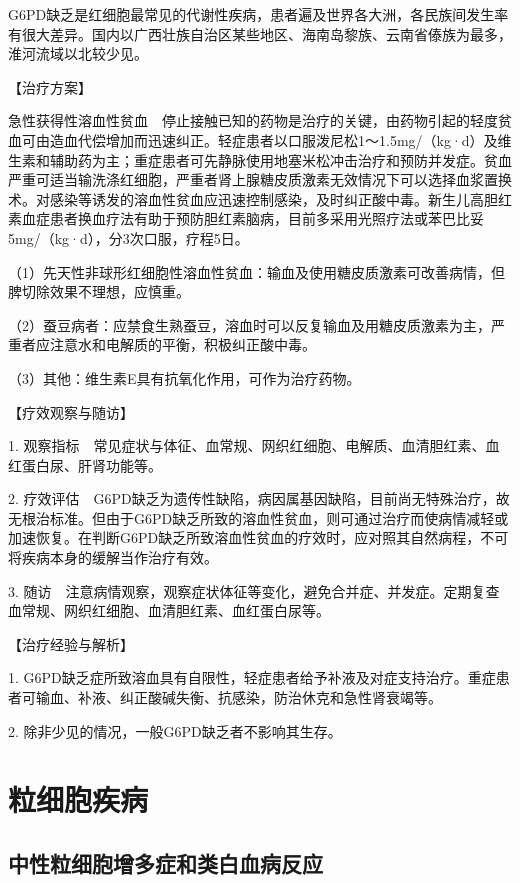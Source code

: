 G6PD缺乏是红细胞最常见的代谢性疾病，患者遍及世界各大洲，各民族间发生率有很大差异。国内以广西壮族自治区某些地区、海南岛黎族、云南省傣族为最多，淮河流域以北较少见。

【治疗方案】

急性获得性溶血性贫血　停止接触已知的药物是治疗的关键，由药物引起的轻度贫血可由造血代偿增加而迅速纠正。轻症患者以口服泼尼松1～1.5mg/（kg·d）及维生素和辅助药为主；重症患者可先静脉使用地塞米松冲击治疗和预防并发症。贫血严重可适当输洗涤红细胞，严重者肾上腺糖皮质激素无效情况下可以选择血浆置换术。对感染等诱发的溶血性贫血应迅速控制感染，及时纠正酸中毒。新生儿高胆红素血症患者换血疗法有助于预防胆红素脑病，目前多采用光照疗法或苯巴比妥5mg/（kg·d），分3次口服，疗程5日。

（1）先天性非球形红细胞性溶血性贫血：输血及使用糖皮质激素可改善病情，但脾切除效果不理想，应慎重。

（2）蚕豆病者：应禁食生熟蚕豆，溶血时可以反复输血及用糖皮质激素为主，严重者应注意水和电解质的平衡，积极纠正酸中毒。

（3）其他：维生素E具有抗氧化作用，可作为治疗药物。

【疗效观察与随访】

1.
观察指标　常见症状与体征、血常规、网织红细胞、电解质、血清胆红素、血红蛋白尿、肝肾功能等。

2.
疗效评估　G6PD缺乏为遗传性缺陷，病因属基因缺陷，目前尚无特殊治疗，故无根治标准。但由于G6PD缺乏所致的溶血性贫血，则可通过治疗而使病情减轻或加速恢复。在判断G6PD缺乏所致溶血性贫血的疗效时，应对照其自然病程，不可将疾病本身的缓解当作治疗有效。

3.
随访　注意病情观察，观察症状体征等变化，避免合并症、并发症。定期复查血常规、网织红细胞、血清胆红素、血红蛋白尿等。

【治疗经验与解析】

1.
G6PD缺乏症所致溶血具有自限性，轻症患者给予补液及对症支持治疗。重症患者可输血、补液、纠正酸碱失衡、抗感染，防治休克和急性肾衰竭等。

2. 除非少见的情况，一般G6PD缺乏者不影响其生存。

\section{粒细胞疾病}

\subsection{中性粒细胞增多症和类白血病反应}

